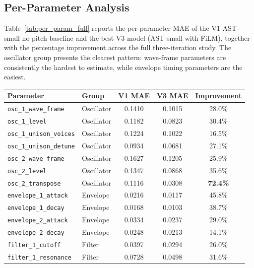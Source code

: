 \subsection{Per-Parameter Analysis}
\label{sec:per_param}

\noindent
Table~\ref{tab:per_param_full} reports the per-parameter MAE of the V1 AST-small no-pitch baseline and the best V3 model (AST-small with FiLM), together with the percentage improvement across the full three-iteration study. The oscillator group presents the clearest pattern: wave-frame parameters are consistently the hardest to estimate, while envelope timing parameters are the easiest.

\begin{table}[H]
\centering
\renewcommand{\arraystretch}{1.3}
\begin{tabular}{llccc}
\hline
\textbf{Parameter} & \textbf{Group} & \textbf{V1 MAE} & \textbf{V3 MAE} & \textbf{Improvement} \\
\hline
\texttt{osc\_1\_wave\_frame}     & Oscillator & 0.1410 & 0.1015 & 28.0\% \\
\texttt{osc\_1\_level}           & Oscillator & 0.1182 & 0.0823 & 30.4\% \\
\texttt{osc\_1\_unison\_voices}  & Oscillator & 0.1224 & 0.1022 & 16.5\% \\
\texttt{osc\_1\_unison\_detune}  & Oscillator & 0.0934 & 0.0681 & 27.1\% \\
\texttt{osc\_2\_wave\_frame}     & Oscillator & 0.1627 & 0.1205 & 25.9\% \\
\texttt{osc\_2\_level}           & Oscillator & 0.1347 & 0.0868 & 35.6\% \\
\texttt{osc\_2\_transpose}       & Oscillator & 0.1116 & 0.0308 & \textbf{72.4\%} \\
\hline
\texttt{envelope\_1\_attack}     & Envelope   & 0.0216 & 0.0117 & 45.8\% \\
\texttt{envelope\_1\_decay}      & Envelope   & 0.0168 & 0.0103 & 38.7\% \\
\texttt{envelope\_2\_attack}     & Envelope   & 0.0334 & 0.0237 & 29.0\% \\
\texttt{envelope\_2\_decay}      & Envelope   & 0.0248 & 0.0213 & 14.1\% \\
\hline
\texttt{filter\_1\_cutoff}       & Filter     & 0.0397 & 0.0294 & 26.0\% \\
\texttt{filter\_1\_resonance}    & Filter     & 0.0728 & 0.0498 & 31.6\% \\

\end{tabular}
\end{table}
